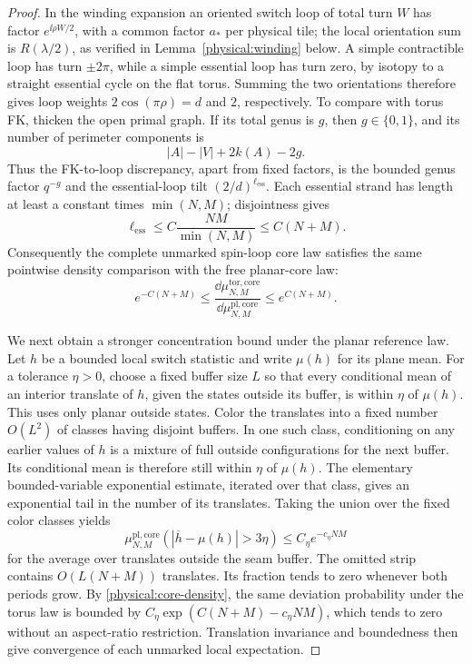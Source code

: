 \begin{proof}
In the winding expansion an oriented switch loop of total turn $W$
has factor $e^{\ii\rho W/2}$, with a common factor $a_*$ per physical
tile; the local orientation sum is $R(\lambda/2)$, as verified in
Lemma~\ref{physical:winding} below. A simple contractible loop has
turn $\pm2\pi$, while a simple essential loop has turn zero, by
isotopy to a straight essential cycle on the flat torus. Summing the
two orientations therefore gives loop weights $2\cos(\pi\rho)=d$
and $2$, respectively. To compare with torus FK,
thicken the open primal graph. If its total genus is \(g\), then
\(g\in\{0,1\}\), and its number of perimeter components is
\[
 |A|-|V|+2k(A)-2g.
\]
Thus the FK-to-loop discrepancy, apart from fixed factors, is the
bounded genus factor \(q^{-g}\) and the essential-loop tilt
\((2/d)^{\ell_{\mathrm{ess}}}\). Each essential strand has length
at least a constant times \(\min(N,M)\); disjointness gives
\[
 \ell_{\mathrm{ess}}\le C\frac{NM}{\min(N,M)}\le C(N+M).
\]
Consequently the complete unmarked spin-loop core law satisfies the
same pointwise density comparison with the free planar-core law:
\begin{equation}\label{physical:core-density}
 e^{-C(N+M)}\le
 \frac{\dd\mu_{N,M}^{\mathrm{tor,core}}}
      {\dd\mu_{N,M}^{\mathrm{pl,core}}}
 \le e^{C(N+M)}.
\end{equation}

We next obtain a stronger concentration bound under the planar
reference law. Let \(h\) be a bounded local switch statistic and
write \(\mu(h)\) for its plane mean. For a tolerance \(\eta>0\),
choose a fixed buffer size \(L\) so that every conditional mean
of an interior translate of \(h\), given the states outside its
buffer, is within \(\eta\) of \(\mu(h)\). This uses only planar
outside states. Color the translates into a fixed number
\(O(L^2)\) of classes having disjoint buffers. In one such class,
conditioning on any earlier values of \(h\) is a mixture of full
outside configurations for the next buffer. Its conditional mean
is therefore still within \(\eta\) of \(\mu(h)\). The elementary
bounded-variable exponential estimate, iterated over that class,
gives an exponential tail in the number of its translates.
Taking the union over the fixed color classes yields
\begin{equation}\label{physical:planar-concentration}
 \mu_{N,M}^{\mathrm{pl,core}}
 \left(\left|\overline h-\mu(h)\right|>3\eta\right)
 \le C_\eta e^{-c_\eta NM}
\end{equation}
for the average over translates outside the seam buffer.
The omitted strip contains \(O(L(N+M))\) translates. Its fraction
tends to zero whenever both periods grow. By
\eqref{physical:core-density}, the same deviation probability under
the torus law is bounded by
\(C_\eta\exp(C(N+M)-c_\eta NM)\), which tends to zero without an
aspect-ratio restriction. Translation invariance and boundedness
then give convergence of each unmarked local expectation.


\end{proof}
